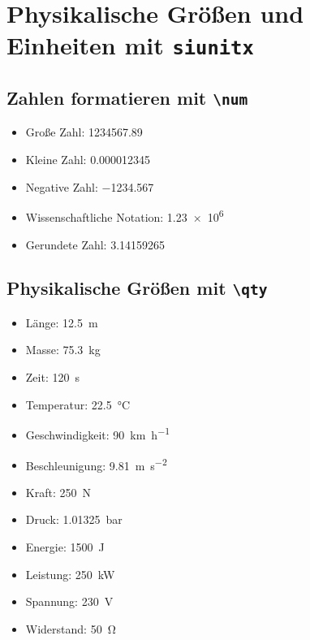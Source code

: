 \documentclass[11pt,a4paper]{scrartcl}
\begin{document}
	
	\section{Physikalische Größen und Einheiten
		mit \texttt{siunitx}}
	
	\subsection{Zahlen formatieren mit \texttt{\textbackslash num}}
	
	\begin{itemize}
		\item Große Zahl: \num{1234567.89}
		\item Kleine Zahl: \num{0.000012345}
		\item Negative Zahl: \num{-1234.567}
		\item Wissenschaftliche Notation: \num{1.23e6}
		\item Gerundete Zahl:
		\num[
		round-mode=places,
		round-precision=2
		]{3.14159265}
	\end{itemize}
	
	\subsection{Physikalische Größen mit \texttt{\textbackslash qty}}
	
	\begin{itemize}
		\item Länge: \qty{12.5}{\metre}
		\item Masse: \qty{75.3}{\kilogram}
		\item Zeit: \qty{120}{\second}
		\item Temperatur: \qty{22.5}{\celsius}
		\item Geschwindigkeit:
		\qty{90}{\kilo\metre\per\hour}
		\item Beschleunigung:
		\qty{9.81}{\metre\per\second\squared}
		\item Kraft: \qty{250}{\newton}
		\item Druck: \qty{1.01325}{\bar}
		\item Energie: \qty{1500}{\joule}
		\item Leistung: \qty{250}{\kilo\watt}
		\item Spannung: \qty{230}{\volt}
		\item Widerstand: \qty{50}{\ohm}
	\end{itemize}
	
\end{document}
